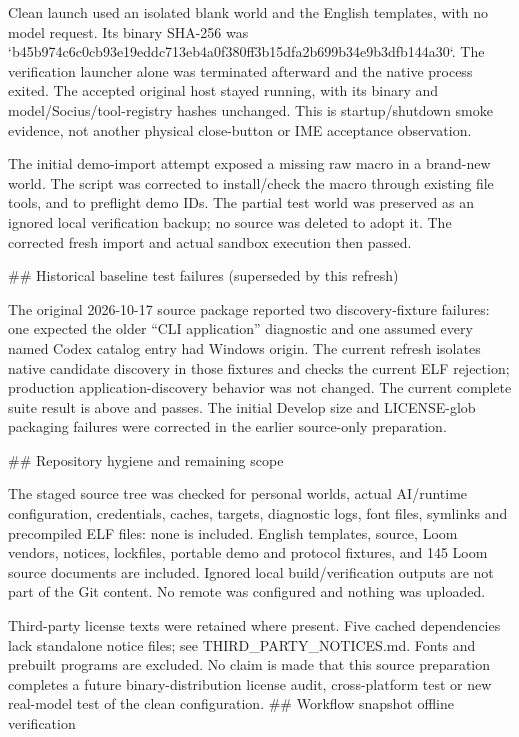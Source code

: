 Clean launch used an isolated blank world and the English templates, with no
model request. Its binary SHA-256 was
`b45b974c6c0cb93e19eddc713eb4a0f380ff3b15dfa2b699b34e9b3dfb144a30`.
The verification launcher alone was terminated afterward and the native
process exited. The accepted original host stayed running, with its binary
and model/Socius/tool-registry hashes unchanged. This is startup/shutdown smoke
evidence, not another physical close-button or IME acceptance observation.

The initial demo-import attempt exposed a missing raw macro in a brand-new
world. The script was corrected to install/check the macro through existing
file tools, and to preflight demo IDs. The partial test world was preserved
as an ignored local verification backup; no source was deleted to adopt it.
The corrected fresh import and actual sandbox execution then passed.

## Historical baseline test failures (superseded by this refresh)

The original 2026-10-17 source package reported two discovery-fixture failures:
one expected the older “CLI application” diagnostic and one assumed every named
Codex catalog entry had Windows origin. The current refresh isolates native
candidate discovery in those fixtures and checks the current ELF rejection;
production application-discovery behavior was not changed. The current complete
suite result is above and passes. The initial Develop size and LICENSE-glob
packaging failures were corrected in the earlier source-only preparation.

## Repository hygiene and remaining scope

The staged source tree was checked for personal worlds, actual AI/runtime
configuration, credentials, caches, targets, diagnostic logs, font files,
symlinks and precompiled ELF files: none is included. English templates, source,
Loom vendors, notices, lockfiles, portable demo and protocol fixtures, and 145 Loom source
documents are included. Ignored local build/verification outputs are not part
of the Git content. No remote was configured and nothing was uploaded.

Third-party license texts were retained where present. Five cached dependencies
lack standalone notice files; see THIRD_PARTY_NOTICES.md. Fonts and prebuilt
programs are excluded. No claim is made that this source preparation completes
a future binary-distribution license audit, cross-platform test or new real-model
test of the clean configuration.
## Workflow snapshot offline verification

